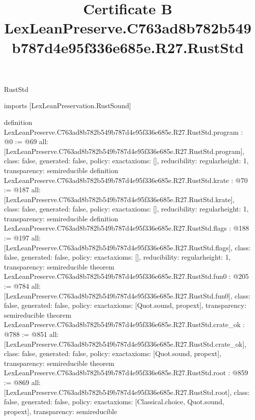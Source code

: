 \begin{lexlean}{RustStd}
\title{Certificate B LexLeanPreserve.C763ad8b782b549b787d4e95f336e685e.R27.RustStd}
\begin{coremodule}
imports [LexLeanPreservation.RustSound]

definition LexLeanPreserve.C763ad8b782b549b787d4e95f336e685e.R27.RustStd.program : @0 := @69 {
  all: [LexLeanPreserve.C763ad8b782b549b787d4e95f336e685e.R27.RustStd.program],
  class: false,
  generated: false,
  policy: exact{axioms: []},
  reducibility: regular{height: 1},
  transparency: semireducible
}
definition LexLeanPreserve.C763ad8b782b549b787d4e95f336e685e.R27.RustStd.krate : @70 := @187 {
  all: [LexLeanPreserve.C763ad8b782b549b787d4e95f336e685e.R27.RustStd.krate],
  class: false,
  generated: false,
  policy: exact{axioms: []},
  reducibility: regular{height: 1},
  transparency: semireducible
}
definition LexLeanPreserve.C763ad8b782b549b787d4e95f336e685e.R27.RustStd.flags : @188 := @197 {
  all: [LexLeanPreserve.C763ad8b782b549b787d4e95f336e685e.R27.RustStd.flags],
  class: false,
  generated: false,
  policy: exact{axioms: []},
  reducibility: regular{height: 1},
  transparency: semireducible
}
theorem LexLeanPreserve.C763ad8b782b549b787d4e95f336e685e.R27.RustStd.fun0 : @205 := @784 {
  all: [LexLeanPreserve.C763ad8b782b549b787d4e95f336e685e.R27.RustStd.fun0],
  class: false,
  generated: false,
  policy: exact{axioms: [Quot.sound, propext]},
  transparency: semireducible
}
theorem LexLeanPreserve.C763ad8b782b549b787d4e95f336e685e.R27.RustStd.crate_ok : @788 := @851 {
  all: [LexLeanPreserve.C763ad8b782b549b787d4e95f336e685e.R27.RustStd.crate_ok],
  class: false,
  generated: false,
  policy: exact{axioms: [Quot.sound, propext]},
  transparency: semireducible
}
theorem LexLeanPreserve.C763ad8b782b549b787d4e95f336e685e.R27.RustStd.root : @859 := @869 {
  all: [LexLeanPreserve.C763ad8b782b549b787d4e95f336e685e.R27.RustStd.root],
  class: false,
  generated: false,
  policy: exact{axioms: [Classical.choice, Quot.sound, propext]},
  transparency: semireducible
}


\end{coremodule}
\end{lexlean}

